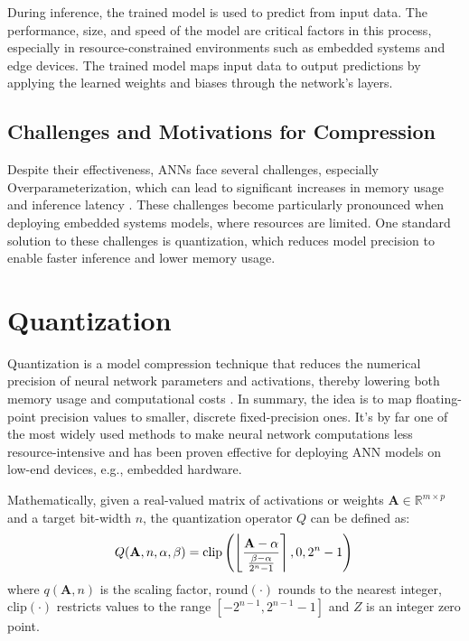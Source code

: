 During inference, the trained model is used to predict from input data. The performance, size, and speed of the model are critical factors in this process, especially in resource-constrained environments such as embedded systems and edge devices. The trained model maps input data to output predictions by applying the learned weights and biases through the network's layers.






\subsection{Challenges and Motivations for Compression}
Despite their effectiveness, ANNs face several challenges, especially Overparameterization, which can lead to significant increases in memory usage and inference latency \cite{han2016deep}. These challenges become particularly pronounced when deploying embedded systems models, where resources are limited. One standard solution to these challenges is quantization, which reduces model precision to enable faster inference and lower memory usage. 

\section{Quantization}


Quantization is a model compression technique that reduces the numerical precision of neural network parameters and activations, thereby lowering both memory usage and computational costs \cite{jacob2018quantization,han2016deep}. In summary, the idea is to map floating-point precision values to smaller, discrete fixed-precision ones. It’s by far one of the most widely used methods to make neural network computations less resource-intensive and has been proven effective for deploying ANN models on low-end devices, e.g., embedded hardware.

Mathematically, given a real-valued matrix of activations or weights $\mathbf{A} \in \mathbb{R}^{m \times p}$ and a target bit-width $n$, the quantization operator $Q$ can be defined as:
\begin{equation}
Q(\mathbf{A}, n, \alpha, \beta) = \text{clip}\left(\left\lfloor \frac{\mathbf{A} - \alpha}{\frac{\beta - \alpha}{2^n - 1}} \right\rceil, 0, 2^n-1\right)\\
\label{eq:quantization}
\end{equation}
where $q(\mathbf{A}, n)$ is the scaling factor, $\text{round}(\cdot)$ rounds to the nearest integer, $\text{clip}(\cdot)$ restricts values to the range $[-2^{n-1}, 2^{n-1}-1]$ and $Z$ is an integer zero point.


